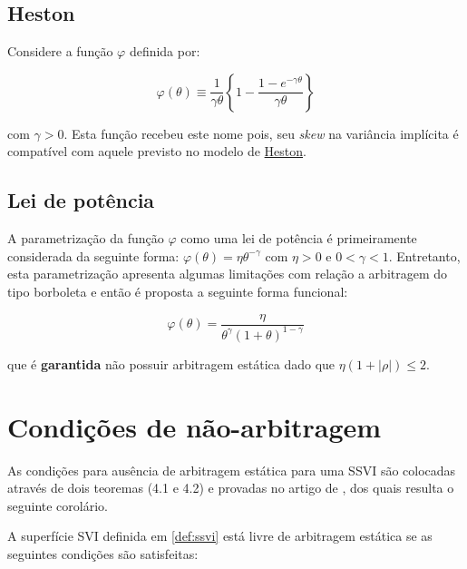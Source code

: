 \documentclass[]{book}
\theoremstyle{definition}
\theoremstyle{definition}
\theoremstyle{definition}
\theoremstyle{remark}
\let\BeginKnitrBlock\begin \let\EndKnitrBlock\end
\begin{document}
\subsection{Heston}\label{heston-1}

Considere a função \(\varphi\) definida por:

\begin{equation}
\varphi(\theta)\equiv\frac{1}{\gamma\theta}\left\lbrace 1-\frac{1-e^{-\gamma\theta}}{\gamma\theta}\right\rbrace
\label{eq:heston-phi}
\end{equation}

com \(\gamma > 0\). Esta função recebeu este nome pois, seu \emph{skew}
na variância implícita é compatível com aquele previsto no modelo de
\protect\hyperlink{superficies}{Heston}.

\subsection{Lei de potência}\label{lei-de-potencia}

A parametrização da função \(\varphi\) como uma lei de potência é
primeiramente considerada da seguinte forma:
\(\varphi(\theta)=\eta\theta^{-\gamma}\) com \(\eta > 0\) e
\(0<\gamma<1\). Entretanto, esta parametrização apresenta algumas
limitações com relação a arbitragem do tipo borboleta e então é proposta
a seguinte forma funcional:

\begin{equation}
\varphi(\theta)=\frac{\eta}{\theta^\gamma(1+\theta)^{1-\gamma}}
\label{eq:pl-phi}
\end{equation}

que é \textbf{garantida} não possuir arbitragem estática dado que
\(\eta(1+|\rho|)\leq 2\).

\section{Condições de não-arbitragem}\label{condicoes-de-nao-arbitragem}

As condições para ausência de arbitragem estática para uma SSVI são
colocadas através de dois teoremas (4.1 e 4.2) e provadas no artigo de
\citep{Gatheral2014}, dos quais resulta o seguinte corolário.

\BeginKnitrBlock{corollary}
\protect\hypertarget{cor:ssvi-arbitrage}{}{\label{cor:ssvi-arbitrage} }A
superfície SVI definida em \ref{def:ssvi} está livre de arbitragem
estática se as seguintes condições são satisfeitas:
\EndKnitrBlock{corollary}
\end{document}
